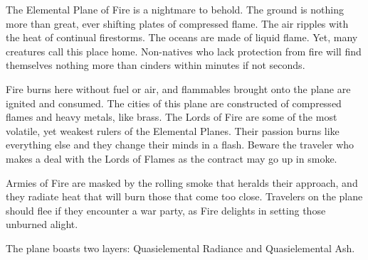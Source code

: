 The Elemental Plane of Fire is a nightmare to behold. The ground is nothing more than great, ever shifting plates of compressed flame. The air ripples with the heat of continual firestorms. The oceans are made of liquid flame. Yet, many creatures call this place home. Non-natives who lack protection from fire will find themselves nothing more than cinders within minutes if not seconds.

Fire burns here without fuel or air, and flammables brought onto the plane are ignited and consumed. The cities of this plane are constructed of compressed flames and heavy metals, like brass. The Lords of Fire are some of the most volatile, yet weakest rulers of the Elemental Planes. Their passion burns like everything else and they change their minds in a flash. Beware the traveler who makes a deal with the Lords of Flames as the contract may go up in smoke.

Armies of Fire are masked by the rolling smoke that heralds their approach, and they radiate heat that will burn those that come too close. Travelers on the plane should flee if they encounter a war party, as Fire delights in setting those unburned alight.

The plane boasts two layers: Quasielemental Radiance and Quasielemental Ash.

\begin{figure}[h!]
\centering
{}
\end{figure}


